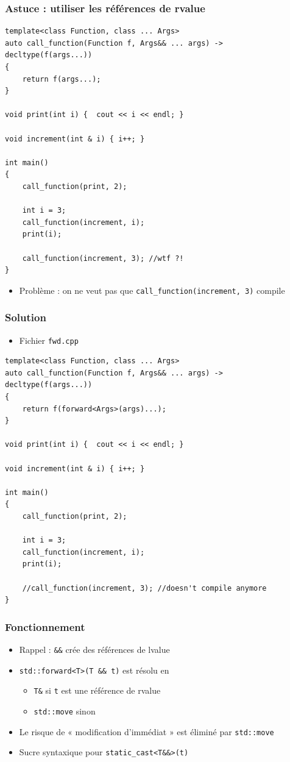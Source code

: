 \begin{frame}[containsverbatim]
\frametitle{Astuce : utiliser les références de rvalue}
\begin{lstlisting}
template<class Function, class ... Args>
auto call_function(Function f, Args&& ... args) -> decltype(f(args...))
{
	return f(args...);
}

void print(int i) {  cout << i << endl; }

void increment(int & i) { i++; }

int main()
{
	call_function(print, 2);

	int i = 3;
	call_function(increment, i);
	print(i);

	call_function(increment, 3); //wtf ?!
}
\end{lstlisting}
\begin{itemize}
\item Problème : on ne veut pas que \lstinline|call_function(increment, 3)| compile
\end{itemize}
\end{frame}

\begin{frame}[containsverbatim]
\frametitle{Solution}
\begin{itemize}
\item Fichier \texttt{fwd.cpp}
\end{itemize}
\begin{lstlisting}
template<class Function, class ... Args>
auto call_function(Function f, Args&& ... args) -> decltype(f(args...))
{
	return f(forward<Args>(args)...);
}

void print(int i) {  cout << i << endl; }

void increment(int & i) { i++; }

int main()
{
	call_function(print, 2);

	int i = 3;
	call_function(increment, i);
	print(i);

	//call_function(increment, 3); //doesn't compile anymore
}
\end{lstlisting}
\end{frame}

\begin{frame}
\frametitle{Fonctionnement}
\begin{itemize}[<+->]
\item Rappel : \texttt{\&\&} crée des références de lvalue
\item \texttt{std::forward<T>(T \&\& t)} est résolu en
	\begin{itemize}
	\item \texttt{T\&} si \texttt{t} est une référence de rvalue
	\item \texttt{std::move} sinon
	\end{itemize}
\item Le risque de « modification d'immédiat » est éliminé par \texttt{std::move}
\item Sucre syntaxique pour \lstinline|static_cast<T&&>(t)|
\end{itemize}
\end{frame}

